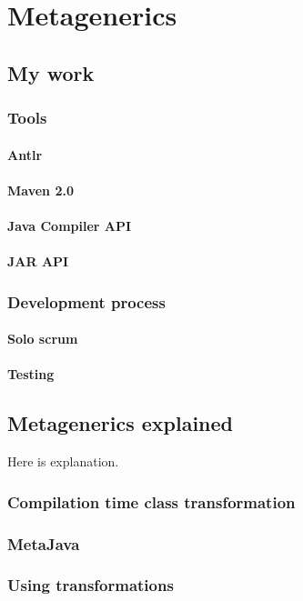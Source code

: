 \chapter{Metagenerics}
\section{My work}
\subsection{Tools}
\subsubsection{Antlr}
\subsubsection{Maven 2.0}
\subsubsection{Java Compiler API}
\subsubsection{JAR API}
\subsection{Development process}
\subsubsection{Solo scrum}
\subsubsection{Testing}

\section{Metagenerics explained}
Here is explanation.
\subsection{Compilation time class transformation}
\subsection{MetaJava}
\subsection{Using transformations}
